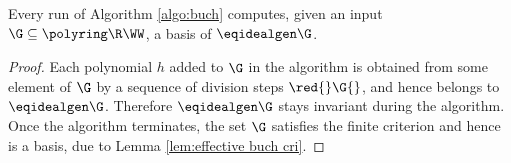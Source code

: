 \begin{lemma}[Correctness]\label{lem: buch correct}
Every run of Algorithm \ref{algo:buch} computes, given an input $\G\subseteq\polyring\R\WW$,
a \Gr basis of $\eqidealgen\G$.
\end{lemma}
%
\begin{proof}
Each polynomial $h$ added to $\G$ in the algorithm 
is obtained from some element of $\G$ by a sequence of division steps 
$\red {} \G {}$, and hence belongs to $\eqidealgen\G$. 
Therefore $\eqidealgen\G$ stays invariant during the algorithm.
Once the algorithm terminates, the set $\G$ satisfies the finite \Bu criterion and hence
is a \Gr basis, due to Lemma \ref{lem:effective buch cri}.
%
\end{proof}

